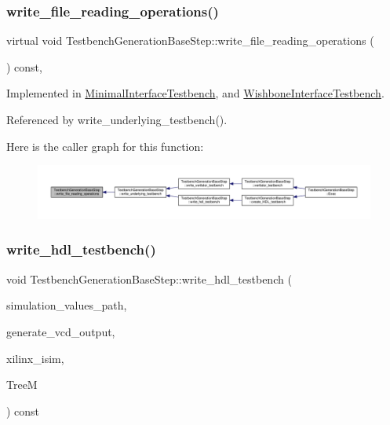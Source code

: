 \subsubsection{\texorpdfstring{write\+\_\+file\+\_\+reading\+\_\+operations()}{write\_file\_reading\_operations()}}
{\footnotesize\ttfamily virtual void Testbench\+Generation\+Base\+Step\+::write\+\_\+file\+\_\+reading\+\_\+operations (\begin{DoxyParamCaption}{ }\end{DoxyParamCaption}) const\hspace{0.3cm}{\ttfamily [protected]}, {}}



Implemented in \hyperlink{classMinimalInterfaceTestbench_a017c01898d65736dccd9531a81151283}{Minimal\+Interface\+Testbench}, and \hyperlink{classWishboneInterfaceTestbench_a0ceb1c7cca0f25da26b7eff3797489bf}{Wishbone\+Interface\+Testbench}.



Referenced by write\+\_\+underlying\+\_\+testbench().

Here is the caller graph for this function\+:
\nopagebreak
\begin{figure}[H]
\begin{center}
\leavevmode
\includegraphics[width=350pt]{dc/d02/classTestbenchGenerationBaseStep_abebc101901191b2ee6732df8c9ecc9ee_icgraph}
\end{center}
\end{figure}
\mbox{\label{classTestbenchGenerationBaseStep_af70241181e695727fd672f4e5fb490a1}} 
\subsubsection{\texorpdfstring{write\+\_\+hdl\+\_\+testbench()}{write\_hdl\_testbench()}}
{\footnotesize\ttfamily void Testbench\+Generation\+Base\+Step\+::write\+\_\+hdl\+\_\+testbench (\begin{DoxyParamCaption}\item[{std\+::string}]{simulation\+\_\+values\+\_\+path,  }\item[{bool}]{generate\+\_\+vcd\+\_\+output,  }\item[{bool}]{xilinx\+\_\+isim,  }\item[{const \hyperlink{tree__manager_8hpp_a792e3f1f892d7d997a8d8a4a12e39346}{tree\+\_\+manager\+Const\+Ref}}]{TreeM }\end{DoxyParamCaption}) const\hspace{0.3cm}{\ttfamily [protected]}}



